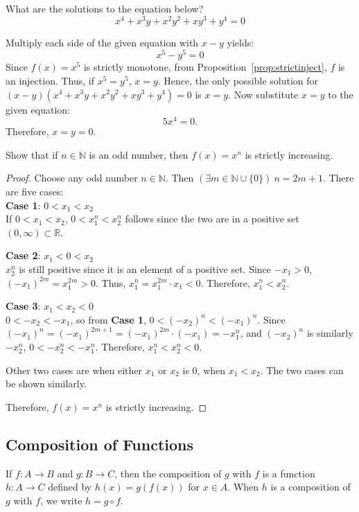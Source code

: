 \documentclass[../main.tex]{subfiles}
\begin{document}
\begin{ex}
    What are the solutions to the equation below?
    \[
        x^4 + x^3 y + x^2 y^2 + x y^3 + y^4 = 0
    \]
\end{ex}
\begin{sol}
    Multiply each side of the given equation with $x - y$ yields:
    \[
        x^5 - y^5 = 0
    \]
    Since $f(x) = x^5$ is strictly monotone, from Proposition~\ref{prop:strictinject}, $f$ is an injection.
    Thus, if $x^5 = y^5$, $x = y$.
    Hence, the only possible solution for $(x - y)(x^4 + x^3 y + x^2 y^2 + x y^3 + y^4) = 0$ is $x = y$.
    Now substitute $x = y$ to the given equation:
    \[
        5x^4 = 0.
    \]
    Therefore, $x = y = 0$.
\end{sol}

\begin{prob}
    Show that if $n \in \mathbb N$ is an odd number, then $f(x) = x^n$ is strictly increasing.
\end{prob}
\begin{proof}
    Choose any odd number $n \in \mathbb N$.
    Then $(\exists m \in \mathbb{N} \cup \{0\})\ n = 2m + 1$.
    There are five cases:\\
    \noindent \textbf{Case 1}: $0 < x_1 < x_2$\\
    \indent If $0 < x_1 < x_2$, $0 < x_1^n < x_2^n$ follows since the two are in a positive set $(0, \infty) \subset \mathbb R$.

    \noindent \textbf{Case 2}: $x_1 < 0 < x_2$\\
    \indent $x_2^n$ is still positive since it is an element of a positive set.
    Since $-x_1 > 0$, $(-x_1)^{2m} = x_1^{2m} > 0$.
    Thus, $x_1^n = x_1^{2m} \cdot x_1 < 0$.
    Therefore, $x_1^n < x_2^n$.

    \noindent \textbf{Case 3}: $x_1 < x_2 < 0$\\
    \indent $0 < -x_2 < -x_1$, so from \textbf{Case 1}, $0 < (-x_2)^n < (-x_1)^n$.
    Since $(-x_1)^n = (-x_1)^{2m + 1} = (-x_1)^{2m} \cdot (-x_1) = -x_1^n$, and $(-x_2)^n$ is similarly $-x_2^n$, $0 < -x_2^n < -x_1^n$.
    Therefore, $x_1^n < x_2^n < 0$.

    Other two cases are when either $x_1$ or $x_2$ is 0, when $x_1 < x_2$.
    The two cases can be shown similarly.

    Therefore, $f(x) = x^n$ is strictly increasing.
\end{proof}

\subsection{Composition of Functions}
\begin{defn}
    If $f: A \rightarrow B$ and $g: B \rightarrow C$, then the \textsf{composition} of $g$ with $f$ is a function $h: A \rightarrow C$ defined by $h(x) = g\left(f(x)\right)$ for $x \in A$.
    When $h$ is a composition of $g$ with $f$, we write $h = g \circ f$.
\end{defn}
\end{document}
